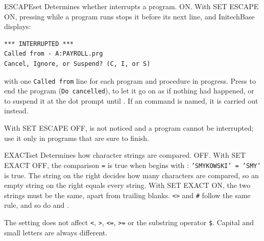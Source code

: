 \begin{XbaseEntry}{ESCAPE}{set}
Determines whether  interrupts a program.
\Syntax
{}
\Defaults
ON.
\Usage
With SET ESCAPE ON, pressing  while a program runs stops it before
its next line, and InitechBase displays:
\begin{verbatim}
*** INTERRUPTED ***
Called from - A:PAYROLL.prg
Cancel, Ignore, or Suspend? (C, I, or S)
\end{verbatim}
with one \texttt{Called from} line for each program and procedure in
progress.  Press  to end the program (\texttt{Do cancelled}),
 to let it go on as if nothing had happened, or  to suspend
it at the dot prompt until .  If an  command is
named, it is carried out instead.

With SET ESCAPE OFF,  is not noticed and a program cannot be
interrupted; use it only in programs that are sure to finish.
\end{XbaseEntry}

\begin{XbaseEntry}{EXACT}{set}
Determines how character strings are compared.
\Syntax
{}
\Defaults
OFF.
\Usage
With SET EXACT OFF, the comparison  \texttt{=}  is true
when  begins with : \texttt{'SMYKOWSKI' = 'SMY'} is true.
The string on the right decides how many characters are compared, so an empty
string on the right equals every string.  With SET EXACT ON, the two strings
must be the same, apart from trailing blanks.  \texttt{<>} and \texttt{\#}
follow the same rule, and so do  and .

The setting does not affect \texttt{<}, \texttt{>}, \texttt{<=}, \texttt{>=} or
the substring operator \texttt{\$}.  Capital and small letters are always
different.
\Examples
{}
\end{XbaseEntry}

